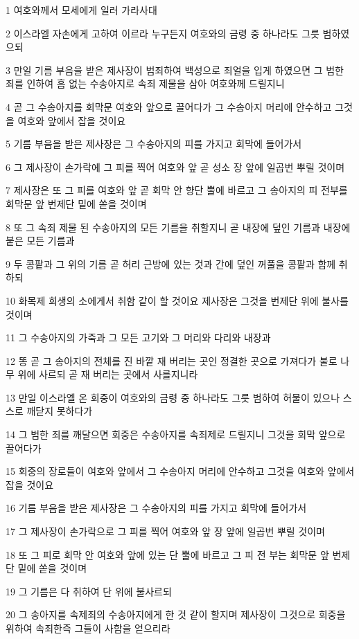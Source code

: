 \par 1 여호와께서 모세에게 일러 가라사대
\par 2 이스라엘 자손에게 고하여 이르라 누구든지 여호와의 금령 중 하나라도 그릇 범하였으되
\par 3 만일 기름 부음을 받은 제사장이 범죄하여 백성으로 죄얼을 입게 하였으면 그 범한 죄를 인하여 흠 없는 수송아지로 속죄 제물을 삼아 여호와께 드릴지니
\par 4 곧 그 수송아지를 회막문 여호와 앞으로 끌어다가 그 수송아지 머리에 안수하고 그것을 여호와 앞에서 잡을 것이요
\par 5 기름 부음을 받은 제사장은 그 수송아지의 피를 가지고 회막에 들어가서
\par 6 그 제사장이 손가락에 그 피를 찍어 여호와 앞 곧 성소 장 앞에 일곱번 뿌릴 것이며
\par 7 제사장은 또 그 피를 여호와 앞 곧 회막 안 향단 뿔에 바르고 그 송아지의 피 전부를 회막문 앞 번제단 밑에 쏟을 것이며
\par 8 또 그 속죄 제물 된 수송아지의 모든 기름을 취할지니 곧 내장에 덮인 기름과 내장에 붙은 모든 기름과
\par 9 두 콩팥과 그 위의 기름 곧 허리 근방에 있는 것과 간에 덮인 꺼풀을 콩팥과 함께 취하되
\par 10 화목제 희생의 소에게서 취함 같이 할 것이요 제사장은 그것을 번제단 위에 불사를 것이며
\par 11 그 수송아지의 가죽과 그 모든 고기와 그 머리와 다리와 내장과
\par 12 똥 곧 그 송아지의 전체를 진 바깥 재 버리는 곳인 정결한 곳으로 가져다가 불로 나무 위에 사르되 곧 재 버리는 곳에서 사를지니라
\par 13 만일 이스라엘 온 회중이 여호와의 금령 중 하나라도 그릇 범하여 허물이 있으나 스스로 깨닫지 못하다가
\par 14 그 범한 죄를 깨달으면 회중은 수송아지를 속죄제로 드릴지니 그것을 회막 앞으로 끌어다가
\par 15 회중의 장로들이 여호와 앞에서 그 수송아지 머리에 안수하고 그것을 여호와 앞에서 잡을 것이요
\par 16 기름 부음을 받은 제사장은 그 수송아지의 피를 가지고 회막에 들어가서
\par 17 그 제사장이 손가락으로 그 피를 찍어 여호와 앞 장 앞에 일곱번 뿌릴 것이며
\par 18 또 그 피로 회막 안 여호와 앞에 있는 단 뿔에 바르고 그 피 전 부는 회막문 앞 번제단 밑에 쏟을 것이며
\par 19 그 기름은 다 취하여 단 위에 불사르되
\par 20 그 송아지를 속제죄의 수송아지에게 한 것 같이 할지며 제사장이 그것으로 회중을 위하여 속죄한즉 그들이 사함을 얻으리라
